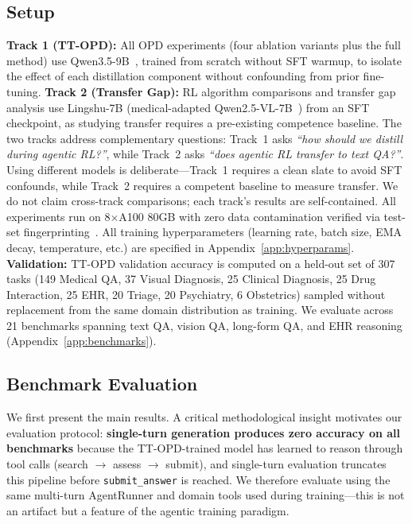 \documentclass{article}
\begin{document}
\subsection{Setup}
\label{sec:setup}

\textbf{Track 1 (TT-OPD):} All OPD experiments (four ablation variants plus the full method) use Qwen3.5-9B~\citep{yang2024qwen25}, trained from scratch without SFT warmup, to isolate the effect of each distillation component without confounding from prior fine-tuning. \textbf{Track 2 (Transfer Gap):} RL algorithm comparisons and transfer gap analysis use Lingshu-7B (medical-adapted Qwen2.5-VL-7B~\citep{yang2024qwen25}) from an SFT checkpoint, as studying transfer requires a pre-existing competence baseline. The two tracks address complementary questions: Track~1 asks \emph{``how should we distill during agentic RL?''}, while Track~2 asks \emph{``does agentic RL transfer to text QA?''}. Using different models is deliberate---Track~1 requires a clean slate to avoid SFT confounds, while Track~2 requires a competent baseline to measure transfer. We do not claim cross-track comparisons; each track's results are self-contained. All experiments run on 8$\times$A100 80GB with zero data contamination verified via test-set fingerprinting~\citep{yang2023rethinking}. All training hyperparameters (learning rate, batch size, EMA decay, temperature, etc.) are specified in Appendix~\ref{app:hyperparams}. \textbf{Validation:} TT-OPD validation accuracy is computed on a held-out set of 307 tasks (149 Medical QA, 37 Visual Diagnosis, 25 Clinical Diagnosis, 25 Drug Interaction, 25 EHR, 20 Triage, 20 Psychiatry, 6 Obstetrics) sampled without replacement from the same domain distribution as training. We evaluate across 21 benchmarks spanning text QA, vision QA, long-form QA, and EHR reasoning (Appendix~\ref{app:benchmarks}).


\subsection{Benchmark Evaluation}
\label{sec:benchmark_multiturn}

We first present the main results. A critical methodological insight motivates our evaluation protocol: \textbf{single-turn generation produces zero accuracy on all benchmarks} because the TT-OPD-trained model has learned to reason through tool calls (search $\to$ assess $\to$ submit), and single-turn evaluation truncates this pipeline before \texttt{submit\_answer} is reached. We therefore evaluate using the same multi-turn AgentRunner and domain tools used during training---this is not an artifact but a feature of the agentic training paradigm.
\end{document}
